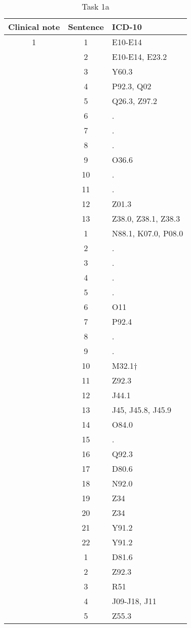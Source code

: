 \begin{table}[htbp] \footnotesize \center
\caption{Task 1a\label{tab:task1a}}
\begin{tabular}{c c l}
    \toprule
    Clinical note & Sentence & ICD-10 \\
    \midrule
	1 & 1 & E10-E14 \\
	 & 2 & E10-E14, E23.2 \\
	 & 3 & Y60.3 \\
	 & 4 & P92.3, Q02 \\
	 & 5 & Q26.3, Z97.2 \\
	 & 6 & . \\
	 & 7 & . \\
	 & 8 & . \\
	 & 9 & O36.6 \\
	 & 10 & . \\
	 & 11 & . \\
	 & 12 & Z01.3 \\
	 & 13 & Z38.0, Z38.1, Z38.3 \\
	\addlinespace
	2 & 1 & N88.1, K07.0, P08.0 \\
	 & 2 & . \\
	 & 3 & . \\
	 & 4 & . \\
	 & 5 & . \\
	 & 6 & O11 \\
	 & 7 & P92.4 \\
	 & 8 & . \\
	 & 9 & . \\
	 & 10 & M32.1† \\
	 & 11 & Z92.3 \\
	 & 12 & J44.1 \\
	 & 13 & J45, J45.8, J45.9 \\
	 & 14 & O84.0 \\
	 & 15 & . \\
	 & 16 & Q92.3 \\
	 & 17 & D80.6 \\
	 & 18 & N92.0 \\
	 & 19 & Z34 \\
	 & 20 & Z34 \\
	 & 21 & Y91.2 \\
	 & 22 & Y91.2 \\
	\addlinespace
	3 & 1 & D81.6 \\
	 & 2 & Z92.3 \\
	 & 3 & R51 \\
	 & 4 & J09-J18, J11 \\
	 & 5 & Z55.3 \\

\end{tabular}
\end{table}
